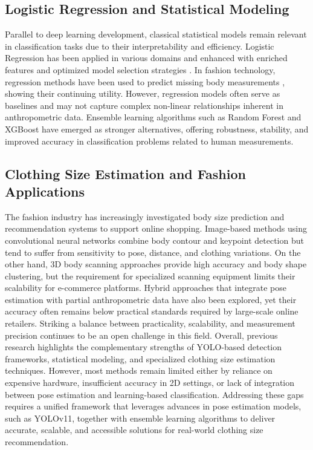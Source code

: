 \documentclass{llncs}
\begin{document}
\subsection{Logistic Regression and Statistical Modeling}

Parallel to deep learning development, classical statistical models remain relevant in classification tasks due to their interpretability and efficiency. 
Logistic Regression has been applied in various domains and enhanced with enriched features \cite{ref7} and optimized model selection strategies \cite{ref8}. 
In fashion technology, regression methods have been used to predict missing body measurements \cite{ref9}, showing their continuing utility. 
However, regression models often serve as baselines and may not capture complex non-linear relationships inherent in anthropometric data. 
Ensemble learning algorithms such as Random Forest and XGBoost have emerged as stronger alternatives, offering robustness, stability, and improved accuracy in classification problems related to human measurements.
\subsection{Clothing Size Estimation and Fashion Applications}

The fashion industry has increasingly investigated body size prediction and recommendation systems to support online shopping. 
Image-based methods using convolutional neural networks \cite{ref10} combine body contour and keypoint detection but tend to suffer from sensitivity to pose, distance, and clothing variations. 
On the other hand, 3D body scanning approaches \cite{ref11} provide high accuracy and body shape clustering, but the requirement for specialized scanning equipment limits their scalability for e-commerce platforms. 
Hybrid approaches that integrate pose estimation with partial anthropometric data have also been explored, yet their accuracy often remains below practical standards required by large-scale online retailers. 
Striking a balance between practicality, scalability, and measurement precision continues to be an open challenge in this field.
Overall, previous research highlights the complementary strengths of YOLO-based detection frameworks, statistical modeling, and specialized clothing size estimation techniques. 
However, most methods remain limited either by reliance on expensive hardware, insufficient accuracy in 2D settings, or lack of integration between pose estimation and learning-based classification. 
Addressing these gaps requires a unified framework that leverages advances in pose estimation models, such as YOLOv11, together with ensemble learning algorithms to deliver accurate, scalable, and accessible solutions for real-world clothing size recommendation.
\end{document}
